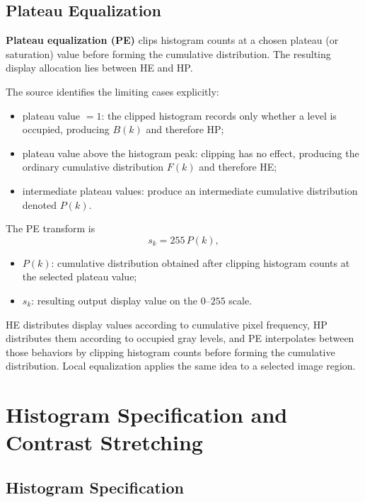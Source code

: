 \documentclass[11pt,a4paper,oneside]{report}
\newcommand{\mathlegend}[1]{%
  \par\vspace{0.2em}{\small\itshape where}\par
  \begin{itemize}[leftmargin=1.7em,topsep=0.15em,itemsep=0.12em]
  #1
  \end{itemize}
}
\begin{document}
\section{Plateau Equalization}

\textbf{Plateau equalization (PE)} clips histogram counts at a chosen plateau (or saturation) value before forming the cumulative distribution. The resulting display allocation lies between HE and HP.

The source identifies the limiting cases explicitly:
\begin{itemize}
  \item plateau value $=1$: the clipped histogram records only whether a level is occupied, producing $B(k)$ and therefore HP;
  \item plateau value above the histogram peak: clipping has no effect, producing the ordinary cumulative distribution $F(k)$ and therefore HE;
  \item intermediate plateau values: produce an intermediate cumulative distribution denoted $P(k)$.
\end{itemize}

The PE transform is
\begin{equation}
  s_k=255\,P(k),
  \label{eq:plateau-equalization}
\end{equation}
\mathlegend{
  \item $P(k)$: cumulative distribution obtained after clipping histogram counts at the selected plateau value;
  \item $s_k$: resulting output display value on the $0$--$255$ scale.
}



\FloatBarrier
\begin{chaptersummary}
HE distributes display values according to cumulative pixel frequency, HP distributes them according to occupied gray levels, and PE interpolates between those behaviors by clipping histogram counts before forming the cumulative distribution. Local equalization applies the same idea to a selected image region.
\end{chaptersummary}

\chapter{Histogram Specification and Contrast Stretching}

\section{Histogram Specification}
\end{document}
